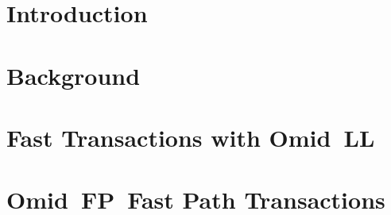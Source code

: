 \documentclass{vldb}
\newcommand{\sys}{Omid~FP}
\newcommand{\sysll}{Omid~LL}
\begin{document}
\begin{abstract}

We describe how we evolve Omid, a transaction processing system for Apache HBase, 
to power Apache Phoenix, a cloud-grade real-time SQL analytics engine.  

Omid was originally designed for data processing pipelines at Yahoo, which are, by and large, 
throughput-oriented monolithic NoSQL applications. 
Providing a platform to support 
converged real-time transaction processing and analytics applications -- dubbed {\em translytics} --  
introduces new functional and performance requirements. For example, SQL 
support is key for developer productivity, multi-tenancy is paramount for cloud deployment, 
and latency is cardinal for just-in-time data ingestion and analytics insights.

We discuss our efforts to adapt Omid to these new domains, 
as part of 
the process of integrating it into Phoenix as the transaction processing backend. A central piece
of our work is latency reduction in Omid's protocol, which also improves   scalability.  
Under light load, the new protocol's latency is 4x to 5x smaller than the legacy Omid's, whereas 
under increased loads it is an order of magnitude faster. We further describe an experimental 
\emph{fast path} for single-key transactions, which enables processing them almost as fast 
as native HBase operations.

\end{abstract}


\section{Introduction} \label{sec:intro}
 

\section{Background} \label{sec:api}


\section{Fast Transactions with \sysll} \label{sec:ll}



\section{\sys\ Fast Path Transactions}
\label{sec:alg}

\end{document}
